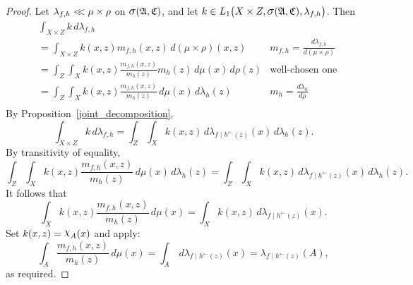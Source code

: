 \documentclass[
twoside=true,
paper=letter,
fontsize=11pt,
pagesize=auto,
leqno,
openany,
headsepline,
overfullrule,
]{scrbook}
\theoremstyle{plain}
\theoremstyle{plain}
\theoremstyle{definition}
\theoremstyle{bfnoteitalic}
\theoremstyle{bfnoteroman}
\newcommand{\sigalg}[1]{\mathfrak{#1}}
\newcommand{\sagb}{\mathop{\hbox{\large{$\sigma$}}}\nolimits}
\newcommand{\charfunction}[1]{{\raisebox{2pt}{$\chi$}}_{#1}}
\newcommand{\preimage}[1]{#1^{\leftarrow}}
\newcommand{\sigmaalgebra}{\sigalg{A}}
\newcommand{\sigmaalgebraiii}{\sigalg{C}}
\newcommand{\productsig}[2]{\sagb(#1,#2)}
\newcommand{\function}{f}
\newcommand{\functioniii}{h}
\newcommand{\functioniv}{k}
\newcommand{\measurespace}{X}
\newcommand{\measurespaceiii}{Z}
\newcommand{\mspaceelt}{x}
\newcommand{\mspaceeltiii}{z}
\newcommand{\abscont}{\mathrel{< \kern-3.5pt <}}
\newcommand{\measure}{\mu}
\newcommand{\measureiii}{\lambda}
\newcommand{\measureiv}{\rho}
\newcommand{\seti}{A}
\begin{document}
\begin{proof}
Let
$\measureiii_{\function,\functioniii} \abscont \measure\times\measureiv$ on 
$\productsig{\sigmaalgebra}{\sigmaalgebraiii}$, 
and let
$\functioniv\in
L_1\bigl(\measurespace\times\measurespaceiii,
\productsig{\sigmaalgebra}{\sigmaalgebraiii},
\measureiii_{\function,\functioniii}\bigr)$.
Then
\begin{align*}
&\int_{\measurespace\times\measurespaceiii}
\functioniv \,d\measureiii_{\function,\functioniii}
\\
& = 
\int_{\measurespace\times\measurespaceiii}
\functioniv(\mspaceelt,\mspaceeltiii) 
m_{\function,\functioniii}(\mspaceelt,\mspaceeltiii)
\,d(\measure\times\measureiv)(\mspaceelt,\mspaceeltiii)
& m_{\function,\functioniii} 
=
\frac{d \measureiii_{\function,\functioniii}}
{d(\measure\times\measureiv)} 
\\
& =
\int_{\measurespaceiii}
\int_{\measurespace}
\functioniv(\mspaceelt,\mspaceeltiii)
\frac{m_{\function,\functioniii}(\mspaceelt,\mspaceeltiii)}
{m_\functioniii (\mspaceeltiii)}
m_\functioniii (\mspaceeltiii)
\,d\measure (\mspaceelt)
\,d\measureiv (\mspaceeltiii)
& \text{well-chosen one}
\\
& =
\int_{\measurespaceiii}
\int_{\measurespace}
\functioniv(\mspaceelt,\mspaceeltiii)
\frac{m_{\function,\functioniii}(\mspaceelt,\mspaceeltiii)}
{m_\functioniii (\mspaceeltiii)}
\,d\measure (\mspaceelt)
\,d \measureiii_\functioniii (\mspaceeltiii)
& m_\functioniii =
\frac{d \measureiii_\functioniii}
{d \measureiv}
\\
\end{align*}
By Proposition~\ref{joint_decomposition},
\[
\int_{\measurespace\times\measurespaceiii} \functioniv\,
d \measureiii_{\function,\functioniii}
=
\int_\measurespaceiii\int_\measurespace
\functioniv(\mspaceelt,\mspaceeltiii) \,
d \measureiii_{\function\mid\preimage{\functioniii}(\mspaceeltiii)}(\mspaceelt)\,
d \measureiii_{\functioniii}(\mspaceeltiii).
\]
By transitivity of equality,
\[
\int_{\measurespaceiii}
\int_{\measurespace}
\functioniv(\mspaceelt,\mspaceeltiii)
\frac{m_{\function,\functioniii}(\mspaceelt,\mspaceeltiii)}
{m_\functioniii (\mspaceeltiii)}
\,d\measure (\mspaceelt)
\,d \measureiii_\functioniii (\mspaceeltiii)
=
\int_\measurespaceiii\int_\measurespace
\functioniv(\mspaceelt,\mspaceeltiii) \,
d \measureiii_{\function\mid\preimage{\functioniii}(\mspaceeltiii)}(\mspaceelt)\,
d \measureiii_{\functioniii}(\mspaceeltiii).
\]
It follows that
\[
\int_{\measurespace}
\functioniv(\mspaceelt,\mspaceeltiii)
\frac{m_{\function,\functioniii}(\mspaceelt,\mspaceeltiii)}
{m_\functioniii (\mspaceeltiii)}
\,d\measure (\mspaceelt)
=
\int_\measurespace
\functioniv(\mspaceelt,\mspaceeltiii) \,
d \measureiii_{\function\mid\preimage{\functioniii}(\mspaceeltiii)}(\mspaceelt).
\]
Set
$\functioniv (\mspaceelt,\mspaceeltiii)
=
\charfunction{\seti}(\mspaceelt)$ and apply:
\[
\int_{\seti}
\frac{m_{\function,\functioniii}(\mspaceelt,\mspaceeltiii)}
{m_\functioniii (\mspaceeltiii)}
\,d\measure (\mspaceelt)
=
\int_\seti
\,d \measureiii_{\function\mid\preimage{\functioniii}(\mspaceeltiii)}(\mspaceelt)
=
\measureiii_{\function\mid\preimage{\functioniii}(\mspaceeltiii)}(\seti),
\]
as required.
\end{proof}
\end{document}
